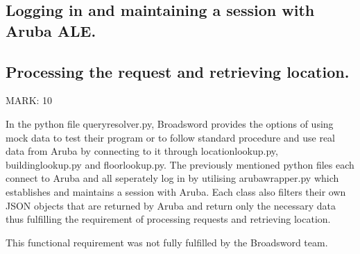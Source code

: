 \documentclass{article}
\begin{document}
\subsection{Logging in and maintaining a session with Aruba ALE.}


\subsection{Processing the request and retrieving location.}

\begin{flushleft}
MARK: 10
\end{flushleft}

\begin{flushleft}
In the python file query\textunderscore resolver.py, Broadsword provides the options of using mock data to test their program or to follow standard procedure and use real data from Aruba by connecting to it through location\textunderscore lookup.py, building\textunderscore lookup.py and floor\textunderscore lookup.py. The previously mentioned python files each connect to Aruba and all seperately log in by utilising aruba\textunderscore wrapper.py which establishes and maintains a session with Aruba. Each class also filters their own JSON objects that are returned by Aruba and return only the necessary data thus fulfilling the requirement of processing requests and retrieving location. 
\end{flushleft}
  
\begin{flushleft}
This functional requirement was not fully fulfilled by the Broadsword team.
\end{flushleft}
\end{document}
